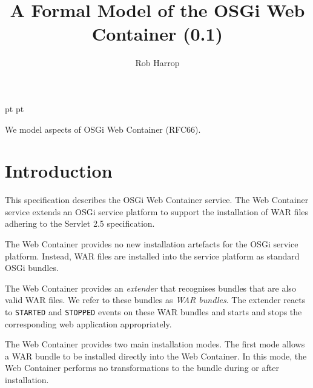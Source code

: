 \documentclass[a4paper,12pt]{article}
\begin{document}
 pt
 pt

\title{A Formal Model of the OSGi Web Container (0.1)}
\author{Rob Harrop}
\maketitle
\thispagestyle{myheadings}
\setcounter{page}{0}

We model aspects of OSGi Web Container (RFC66).


\newcommand{\true}{true}
\newcommand{\false}{false}
\newcommand{\ModuleDefZero}{ModuleDef_0}
\newcommand{\ModuleDefOne}{ModuleDef_1}
\newcommand{\ModuleDefTwo}{ModuleDef_2}
\newcommand{\ModuleDefThree}{ModuleDef_3}
\newcommand{\ModuleDefFour}{ModuleDef_4}
\newcommand{\defaultsTo}{\mathbin{\sf defaultsTo}}

\clearpage
\tableofcontents
\clearpage
{}
\section{Introduction}

This specification describes the OSGi Web Container service. The Web Container service extends an OSGi service platform to support the installation of WAR files adhering to the Servlet 2.5 specification.

The Web Container provides no new installation artefacts for the OSGi service platform. Instead, WAR files are installed into the service platform as standard OSGi bundles. 

The Web Container provides an \emph{extender} that recognises bundles that are also valid WAR files. We refer to these bundles as \emph{WAR bundles}. The extender reacts to {\tt STARTED} and {\tt STOPPED} events on these WAR bundles and starts and stops the corresponding web application appropriately.

The Web Container provides two main installation modes. The first mode allows a WAR bundle to be installed directly into the Web Container. In this mode, the Web Container performs no transformations to the bundle during or after installation.
\end{document}
